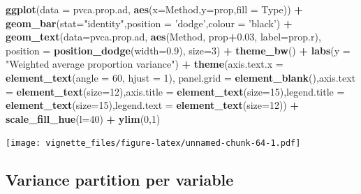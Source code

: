 \documentclass[]{book}
\newenvironment{Shaded}{\begin{snugshade}}{\end{snugshade}}
\newcommand{\KeywordTok}[1]{\textcolor[rgb]{0.13,0.29,0.53}{\textbf{#1}}}
\newcommand{\DataTypeTok}[1]{\textcolor[rgb]{0.13,0.29,0.53}{#1}}
\newcommand{\DecValTok}[1]{\textcolor[rgb]{0.00,0.00,0.81}{#1}}
\newcommand{\FloatTok}[1]{\textcolor[rgb]{0.00,0.00,0.81}{#1}}
\newcommand{\StringTok}[1]{\textcolor[rgb]{0.31,0.60,0.02}{#1}}
\newcommand{\OperatorTok}[1]{\textcolor[rgb]{0.81,0.36,0.00}{\textbf{#1}}}
\newcommand{\NormalTok}[1]{#1}
\begin{document}
\begin{Shaded}
\begin{Highlighting}[]
\KeywordTok{ggplot}\NormalTok{(}\DataTypeTok{data =}\NormalTok{ pvca.prop.ad, }\KeywordTok{aes}\NormalTok{(}\DataTypeTok{x=}\NormalTok{Method,}\DataTypeTok{y=}\NormalTok{prop,}\DataTypeTok{fill =}\NormalTok{ Type)) }\OperatorTok{+}\StringTok{ }\KeywordTok{geom_bar}\NormalTok{(}\DataTypeTok{stat=}\StringTok{"identity"}\NormalTok{,}\DataTypeTok{position =} \StringTok{'dodge'}\NormalTok{,}\DataTypeTok{colour =} \StringTok{'black'}\NormalTok{) }\OperatorTok{+}\StringTok{ }\KeywordTok{geom_text}\NormalTok{(}\DataTypeTok{data=}\NormalTok{pvca.prop.ad, }\KeywordTok{aes}\NormalTok{(Method, prop}\OperatorTok{+}\FloatTok{0.03}\NormalTok{, }\DataTypeTok{label=}\NormalTok{prop.r), }\DataTypeTok{position =} \KeywordTok{position_dodge}\NormalTok{(}\DataTypeTok{width=}\FloatTok{0.9}\NormalTok{), }\DataTypeTok{size=}\DecValTok{3}\NormalTok{) }\OperatorTok{+}\StringTok{ }\KeywordTok{theme_bw}\NormalTok{() }\OperatorTok{+}\StringTok{ }\KeywordTok{labs}\NormalTok{(}\DataTypeTok{y =} \StringTok{"Weighted average proportion variance"}\NormalTok{) }\OperatorTok{+}\StringTok{ }\KeywordTok{theme}\NormalTok{(}\DataTypeTok{axis.text.x =} \KeywordTok{element_text}\NormalTok{(}\DataTypeTok{angle =} \DecValTok{60}\NormalTok{, }\DataTypeTok{hjust =} \DecValTok{1}\NormalTok{), }\DataTypeTok{panel.grid =} \KeywordTok{element_blank}\NormalTok{(),}\DataTypeTok{axis.text =} \KeywordTok{element_text}\NormalTok{(}\DataTypeTok{size=}\DecValTok{12}\NormalTok{),}\DataTypeTok{axis.title =} \KeywordTok{element_text}\NormalTok{(}\DataTypeTok{size=}\DecValTok{15}\NormalTok{),}\DataTypeTok{legend.title =} \KeywordTok{element_text}\NormalTok{(}\DataTypeTok{size=}\DecValTok{15}\NormalTok{),}\DataTypeTok{legend.text =} \KeywordTok{element_text}\NormalTok{(}\DataTypeTok{size=}\DecValTok{12}\NormalTok{)) }\OperatorTok{+}\StringTok{ }\KeywordTok{scale_fill_hue}\NormalTok{(}\DataTypeTok{l=}\DecValTok{40}\NormalTok{) }\OperatorTok{+}\StringTok{ }\KeywordTok{ylim}\NormalTok{(}\DecValTok{0}\NormalTok{,}\DecValTok{1}\NormalTok{)}
\end{Highlighting}
\end{Shaded}

\texttt{[image: vignette\_files/figure-latex/unnamed-chunk-64-1.pdf]}

\subsection{Variance partition per
variable}\label{variance-partition-per-variable}
\end{document}
